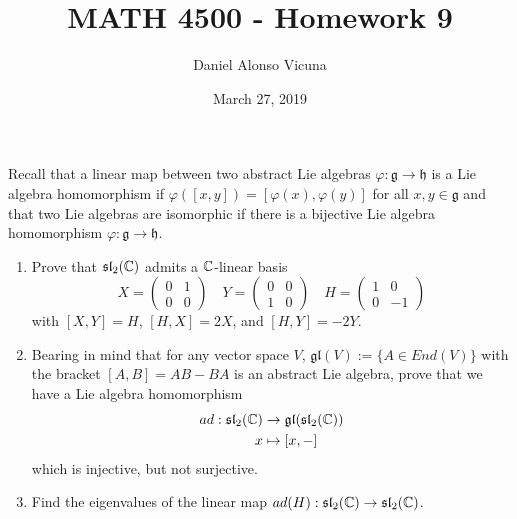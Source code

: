 \documentclass[12pt,onecolumn]{article}
\title{MATH 4500 - Homework 9}
\author{Daniel Alonso Vicuna}
\date{March 27, 2019}
\begin{document}
\maketitle
\begin{exercise}
Recall that a linear map between two abstract Lie algebras $\varphi : \mathfrak{g} \rightarrow \mathfrak{h}$ is a Lie algebra homomorphism if $\varphi([x, y]) =
[\varphi(x), \varphi(y)]$ for all $x, y \in \mathfrak{g}$ and that two Lie algebras are isomorphic if there is a bijective Lie algebra homomorphism $\varphi : \mathfrak{g} \rightarrow \mathfrak{h}$.
\begin{enumerate}[label=(\alph*)]
    \item Prove that $\mathfrak{sl}_2(\operatorname{\mathbb{C}})$ admits a $\operatorname{\mathbb{C}}$-linear basis 
    \[
    X = \begin{pmatrix}0 & 1 \\ 0 & 0 \end{pmatrix}
    \quad 
    Y = \begin{pmatrix}0 & 0 \\ 1 & 0 \end{pmatrix}
    \quad 
    H = \begin{pmatrix}1 & 0 \\ 0 & -1 \end{pmatrix}
    \]
    with $[X,Y]=H$, $[H,X]=2X$, and $[H,Y]=-2Y$.
    \begin{answer}
    
    \end{answer}
    \item Bearing in mind that for any vector space $V$, $\mathfrak{gl}(V):= \{A ∈ End(V )\}$ with the bracket $[A, B] = AB − BA$ is an abstract Lie algebra, prove that we have a Lie algebra homomorphism
    \begin{align*}
    ad : \mathfrak{sl}_2(\operatorname{\mathbb{C}}) &\rightarrow \mathfrak{gl}(\mathfrak{sl}_2(\operatorname{\mathbb{C}})) \\
    x &\mapsto [x,-]
    \end{align*}
    which is injective, but not surjective.
    \begin{answer}
    
    \end{answer}
    \item Find the eigenvalues of the linear map $ad(H): \mathfrak{sl}_2(\operatorname{\mathbb{C}}) \rightarrow \mathfrak{sl}_2(\operatorname{\mathbb{C}})$.
    \begin{answer}
    
    \end{answer}
\end{enumerate}
\end{exercise}
\end{document}
